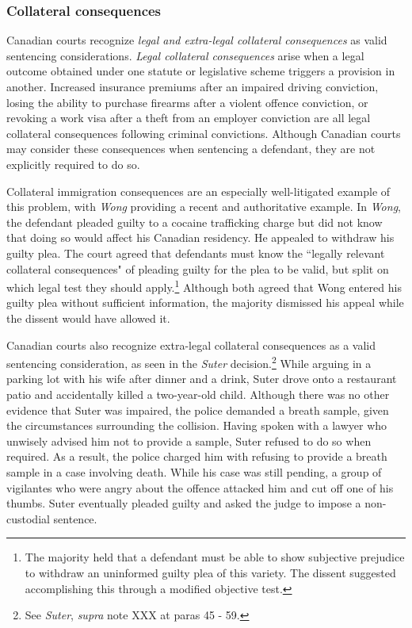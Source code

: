 \subsubsection{Collateral consequences}

Canadian courts recognize \textit{legal and extra-legal collateral consequences} as valid sentencing considerations. \textit{Legal collateral consequences} arise when a legal outcome obtained under one statute or legislative scheme triggers a provision in another. Increased insurance premiums after an impaired driving conviction, losing the ability to purchase firearms after a violent offence conviction, or revoking a work visa after a theft from an employer conviction are all legal collateral consequences following criminal convictions. Although Canadian courts may consider these consequences when sentencing a defendant, they are not explicitly required to do so. 

Collateral immigration consequences are an especially well-litigated example of this problem, with \textit{Wong} providing a recent and authoritative example. In \textit{Wong}, the defendant pleaded guilty to a cocaine trafficking charge but did not know that doing so would affect his Canadian residency. He appealed to withdraw his guilty plea. The court agreed that defendants must know the ``legally relevant collateral consequences" of pleading guilty for the plea to be valid, but split on which legal test they should apply.\footnote{The majority held that a defendant must be able to show subjective prejudice to withdraw an uninformed guilty plea of this variety. The dissent suggested accomplishing this through a modified objective test.} Although both agreed that Wong entered his guilty plea without sufficient information, the majority dismissed his appeal while the dissent would have allowed it.

Canadian courts also recognize extra-legal collateral consequences as a valid sentencing consideration, as seen in the \textit{Suter} decision.\footnote{See \textit{Suter}, \textit{supra} note XXX at paras 45 - 59.} While arguing in a parking lot with his wife after dinner and a drink, Suter drove onto a restaurant patio and accidentally killed a two-year-old child. Although there was no other evidence that Suter was impaired, the police demanded a breath sample, given the circumstances surrounding the collision. Having spoken with a lawyer who unwisely advised him not to provide a sample, Suter refused to do so when required. As a result, the police charged him with refusing to provide a breath sample in a case involving death. While his case was still pending, a group of vigilantes who were angry about the offence attacked him and cut off one of his thumbs. Suter eventually pleaded guilty and asked the judge to impose a non-custodial sentence.

